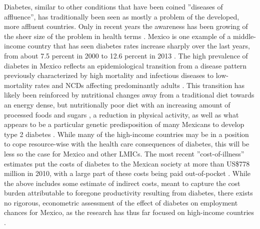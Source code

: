 Diabetes, similar to other conditions that have been coined ''diseases of affluence'', has traditionally been seen as mostly a problem of the developed, more affluent countries. Only in recent
years the awareness has been growing of the sheer size of the problem
in health terms \parencite{Yach2006,Hu2011a}. Mexico is one example of
a middle-income country that has seen diabetes rates increase sharply
over the last years, from about 7.5 percent in 2000 \parencite{Barquera2013}
to 12.6 percent in 2013 \parencite{InternationalDiabetesFederation2013}.
The high prevalence of diabetes in Mexico reflects an epidemiological
transition from a disease pattern previously characterized by high
mortality and infectious diseases to low-mortality rates and \acp{NCD}
affecting predominantly adults \parencite{Stevens2008}. This transition
has likely been reinforced by nutritional changes away from a traditional
diet towards an energy dense, but nutritionally poor diet with an
increasing amount of processed foods and sugars \parencite{Barquera2008b,Basu2013,Rivera2004a},
a reduction in physical activity, as well as what appears to be a
particular genetic predisposition of many Mexicans to develop type
2 diabetes \parencite{Williams2013}. While many of the high-income countries
may be in a position to cope resource-wise with the health care consequences
of diabetes, this will be less so the case for Mexico and other \acp{LMIC}.
The most recent ''cost-of-illness'' estimates put the costs of diabetes
to the Mexican society at more than US\$778 million in 2010, with
a large part of these costs being paid out-of-pocket \parencite{A.2011z}.
While the above includes some estimate of indirect costs, meant to
capture the cost burden attributable to foregone productivity resulting
from diabetes, there exists no rigorous, econometric assessment of
the effect of diabetes on employment chances for Mexico, as the research
has thus far focused on high-income countries \parencite{Lin2011b,Latif2009,Brown2005,Minor2010a,Bastida2002a,Vijan2004,Zhang2009}.

